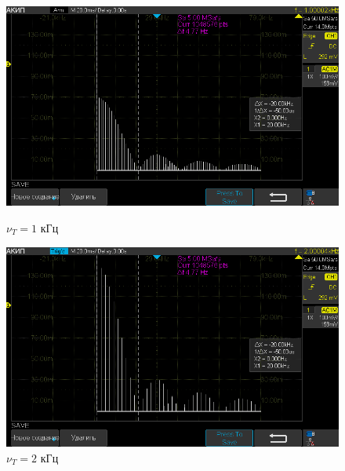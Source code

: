\begin{figure}[H]
	\centering
	\begin{minipage}[b]{.5\textwidth}
		\vspace*{-10pt}
		\centering
		\includegraphics[width=0.9\linewidth]{"../photos/impulse1.png"}
		\vspace*{-5pt}
		\caption*{$\nu_T= 1$ кГц}
		\vspace*{-10pt}
	\end{minipage}%
	\begin{minipage}[b]{.5\textwidth}
		\vspace*{-10pt}
		\centering
		\includegraphics[width=0.9\linewidth]{"../photos/impulse2.png"}
		\vspace*{-5pt}
		\caption*{$\nu_T= 2$ кГц}
		\vspace*{-10pt}
	\end{minipage}
\end{figure}
